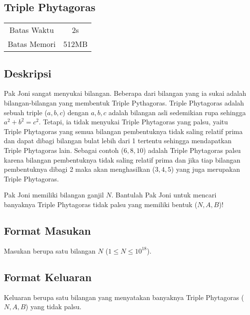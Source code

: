 \documentclass{article}
\begin{document}
\begin{center}
    \section*{Triple Phytagoras} %

    \begin{tabular}{ | c c | }
        \hline
        Batas Waktu  & 2s \\    %
        Batas Memori & 512MB \\  %
        \hline
    \end{tabular}
\end{center}

\subsection*{Deskripsi}

Pak Joni sangat menyukai bilangan. Beberapa dari bilangan yang ia sukai adalah 
bilangan-bilangan yang membentuk Triple Pythagoras. 
Triple Phytagoras adalah sebuah triple ($a, b, c$) dengan $a, b, c$ adalah bilangan asli sedemikian rupa sehingga 
$a^2 + b^2 = c^2$. Tetapi, ia tidak menyukai Triple Phytagoras yang palsu, yaitu Triple Phytagoras yang semua bilangan 
pembentuknya tidak saling relatif prima dan dapat dibagi bilangan bulat lebih dari 1 tertentu sehingga mendapatkan Triple Phytagoras lain. 
Sebagai contoh ($6, 8, 10$) adalah Triple Phytagoras palsu karena bilangan pembentuknya 
tidak saling relatif prima dan jika tiap bilangan pembentuknya dibagi 2 maka akan 
menghasilkan ($3, 4, 5$) yang juga merupakan Triple Phytagoras.

Pak Joni memiliki bilangan ganjil $N$. Bantulah Pak Joni untuk mencari banyaknya Triple Phytagoras tidak palsu yang memiliki bentuk ($N, A, B$)!


\subsection*{Format Masukan}

Masukan berupa satu bilangan $N$ ($1 \leq N \leq 10^{18}$).

\subsection*{Format Keluaran}

Keluaran berupa satu bilangan yang menyatakan banyaknya Triple Phytagoras ($N, A, B$) yang tidak palsu.
\\
\end{document}
